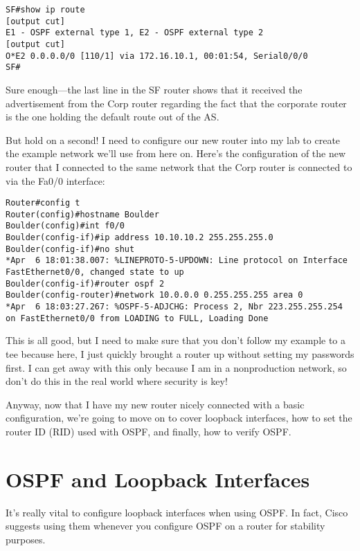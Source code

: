 \begin{verbatim}
SF#show ip route
[output cut]
E1 - OSPF external type 1, E2 - OSPF external type 2
[output cut]
O*E2 0.0.0.0/0 [110/1] via 172.16.10.1, 00:01:54, Serial0/0/0
SF#
\end{verbatim}

Sure enough---the last line in the SF router shows that it received the
advertisement from the Corp router regarding the fact that the corporate
router is the one holding the default route out of the AS.

But hold on a second! I need to configure our new router into my lab to
create the example network we'll use from here on. Here's the
configuration of the new router that I connected to the same network
that the Corp router is connected to via the Fa0/0 interface:

\begin{verbatim}
Router#config t
Router(config)#hostname Boulder
Boulder(config)#int f0/0
Boulder(config-if)#ip address 10.10.10.2 255.255.255.0
Boulder(config-if)#no shut
*Apr  6 18:01:38.007: %LINEPROTO-5-UPDOWN: Line protocol on Interface FastEthernet0/0, changed state to up
Boulder(config-if)#router ospf 2
Boulder(config-router)#network 10.0.0.0 0.255.255.255 area 0
*Apr  6 18:03:27.267: %OSPF-5-ADJCHG: Process 2, Nbr 223.255.255.254 on FastEthernet0/0 from LOADING to FULL, Loading Done
\end{verbatim}

This is all good, but I need to make sure that you don't follow my
example to a tee because here, I just quickly brought a router up
without setting my passwords first. I can
\protect\hypertarget{c18.xhtmlux5cux23Page_762}{}{}get away with this
only because I am in a nonproduction network, so don't do this in the
real world where security is key!

Anyway, now that I have my new router nicely connected with a basic
configuration, we're going to move on to cover loopback interfaces, how
to set the router ID (RID) used with OSPF, and finally, how to verify
OSPF.



\section{OSPF and Loopback Interfaces}

It's really vital to configure loopback interfaces when using OSPF. In
fact, Cisco suggests using them whenever you configure OSPF on a router
for stability purposes.


